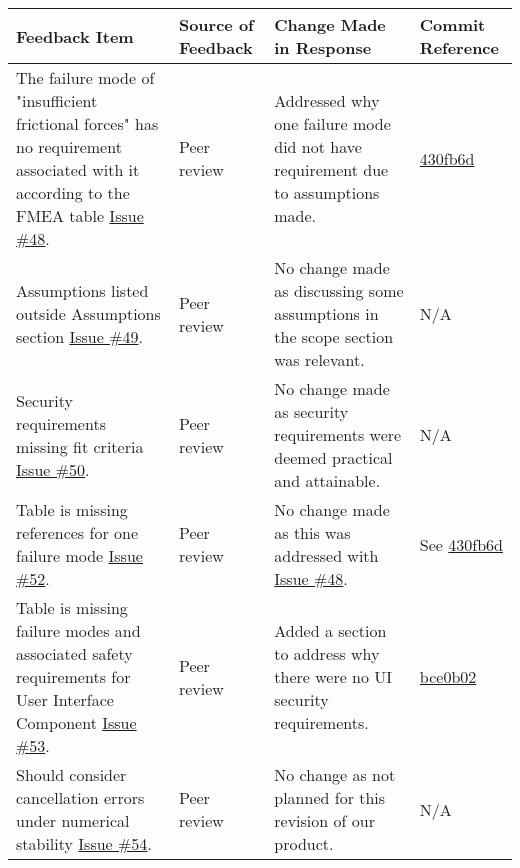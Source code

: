\documentclass{article}
\begin{document}
    \begin{longtable}{|p{4cm}|p{1.5cm}|p{4cm}|p{1.5cm}|}
    \hline
    \textbf{Feedback Item} & \textbf{Source of Feedback} & \textbf{Change Made in Response} & \textbf{Commit Reference} \\
    \hline
    \endfirsthead
    \hline
    \endhead
    \hline
    \endfoot
    \hline
    \endlastfoot
    The failure mode of "insufficient frictional forces" has no requirement associated with it according to the FMEA table \href{https://github.com/gr812b/CVT-Simulator/issues/48}{Issue \#48}. & Peer review  & Addressed why one failure mode did not have requirement due to assumptions made. & 
    \href{https://github.com/gr812b/CVT-Simulator/commit/430fb6dd9bbe740c4c952e974f0799712f0055c0}{430fb6d} \\
    \hline
    Assumptions listed outside Assumptions section \href{https://github.com/gr812b/CVT-Simulator/issues/49}{Issue \#49}. & Peer review & No change made as discussing some assumptions in the scope section was relevant. & N/A\\
    \hline 
    Security requirements missing fit criteria \href{https://github.com/gr812b/CVT-Simulator/issues/50}{Issue \#50}. & Peer review & No change made as security requirements were deemed practical and attainable. & N/A\\
    \hline
    Table is missing references for one failure mode \href{https://github.com/gr812b/CVT-Simulator/issues/52}{Issue \#52}. & Peer review & No change made as this was addressed with \href{https://github.com/gr812b/CVT-Simulator/issues/48}{Issue \#48}. & See     \href{https://github.com/gr812b/CVT-Simulator/commit/430fb6dd9bbe740c4c952e974f0799712f0055c0}{430fb6d} \\
    \hline
    Table is missing failure modes and associated safety requirements for User Interface Component \href{https://github.com/gr812b/CVT-Simulator/issues/53}{Issue \#53}. & Peer review & Added a section to address why there were no UI security requirements. & \href{https://github.com/gr812b/CVT-Simulator/commit/bce0b0260aeedc43a905349bb702547b7a445af0}{bce0b02}\\
    \hline
    Should consider cancellation errors under numerical stability \href{https://github.com/gr812b/CVT-Simulator/issues/54}{Issue \#54}. & Peer review & No change as not planned for this revision of our product. & N/A\\
    \hline 

\end{longtable}
\end{document}
